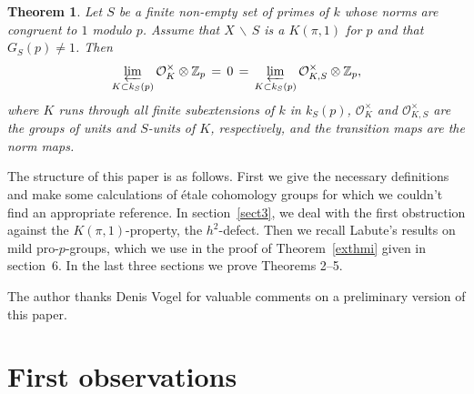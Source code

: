\documentclass[10pt]{article}
\newcommand{\Z}{{\mathbb Z}}
\renewcommand{\O}{{\mathcal{O}}}
\newcommand{\sm}{{\,\smallsetminus\,}}
\theoremstyle{alex}
\newtheorem{itheorem}{Theorem}
\theoremstyle{alexdef}
\begin{document}
\begin{itheorem} \label{1.4} Let $S$ be a finite non-empty set of primes of\/ $k$ whose norms are congruent to $1$ modulo $p$. Assume that $X\sm S$ is a $K(\pi,1)$ for $p$ and that $G_S(p)\neq 1$. Then
\[
\varprojlim_{K\subset k_S(p)} \O_K^\times \otimes \Z_p\,=\,0\,=\,\varprojlim_{K\subset k_S(p)} \O_{K,S}^\times \otimes \Z_p,
\]
where $K$ runs through all finite subextensions of\/ $k$ in $k_S(p)$, $\O_K^\times$ and $\O_{K,S}^\times$ are the groups of units and $S$-units of\/ $K$, respectively, and the transition maps are the norm maps.
\end{itheorem}


\bigskip
The structure of this paper is as follows. First we give the necessary definitions and make some calculations of \'{e}tale cohomology groups for which we couldn't find an appropriate reference. In section~\ref{sect3}, we deal with the first obstruction against the $K(\pi,1)$-property, the $h^2$-defect. Then we recall Labute's results on mild pro-$p$-groups, which we use in the proof of Theorem~\ref{exthmi} given in section~6. In the last three sections we prove Theorems 2--5.

\bigskip
The author thanks Denis Vogel for valuable comments on a preliminary version of this paper.


\section{First observations}\label{1}
\end{document}
